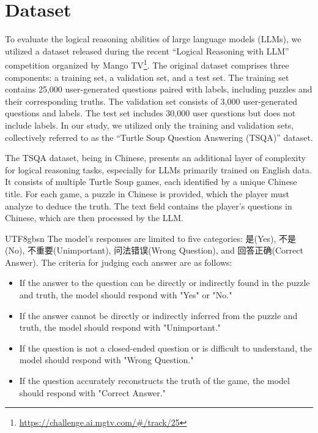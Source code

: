 \documentclass[conference]{IEEEtran}
\begin{document}
\section{Dataset}

To evaluate the logical reasoning abilities of large language models (LLMs), we utilized a dataset released during the recent “Logical Reasoning with LLM” competition organized by Mango TV\footnote{\url{https://challenge.ai.mgtv.com/#/track/25}}. The original dataset comprises three components: a training set, a validation set, and a test set. The training set contains 25,000 user-generated questions paired with labels, including puzzles and their corresponding truths. The validation set consists of 3,000 user-generated questions and labels. The test set includes 30,000 user questions but does not include labels. In our study, we utilized only the training and validation sets, collectively referred to as the “Turtle Soup Question Answering (TSQA)” dataset.

The TSQA dataset, being in Chinese, presents an additional layer of complexity for logical reasoning tasks, especially for LLMs primarily trained on English data. It consists of multiple Turtle Soup games, each identified by a unique Chinese title. For each game, a puzzle in Chinese is provided, which the player must analyze to deduce the truth. The text field contains the player's questions in Chinese, which are then processed by the LLM.

\begin{CJK*}{UTF8}{gbsn}
The model's responses are limited to five categories: 是(Yes), 不是(No), 不重要(Unimportant), 问法错误(Wrong Question), and 回答正确(Correct Answer). The criteria for judging each answer are as follows:
\end{CJK*}
\begin{itemize}
    \item If the answer to the question can be directly or indirectly found in the puzzle and truth, the model should respond with "Yes" or "No."
    \item If the answer cannot be directly or indirectly inferred from the puzzle and truth, the model should respond with "Unimportant."
    \item If the question is not a closed-ended question or is difficult to understand, the model should respond with "Wrong Question."
    \item If the question accurately reconstructs the truth of the game, the model should respond with "Correct Answer."
\end{itemize}
\end{document}

